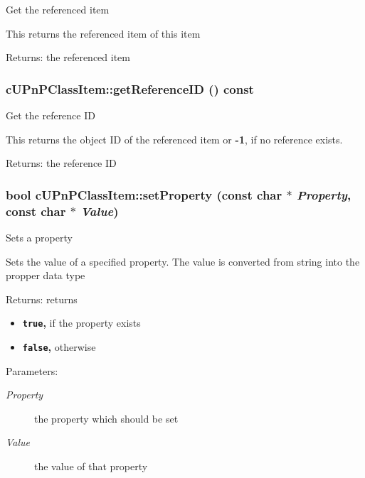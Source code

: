 Get the referenced item

This returns the referenced item of this item

\begin{Desc}
\item[Returns:]the referenced item \end{Desc}
\hypertarget{classcUPnPClassItem_c269fe6cfe8846722b90810a21e42bfc}{
\subsubsection[{getReferenceID}]{ cUPnPClassItem::getReferenceID () const}}
\label{classcUPnPClassItem_c269fe6cfe8846722b90810a21e42bfc}


Get the reference ID

This returns the object ID of the referenced item or {\bf -1}, if no reference exists.

\begin{Desc}
\item[Returns:]the reference ID \end{Desc}
\hypertarget{classcUPnPClassItem_ab17057659c17792a5b67f4297ade642}{
\subsubsection[{setProperty}]{\setlength{\rightskip}{0pt plus 5cm}bool cUPnPClassItem::setProperty (const char $\ast$ {\em Property}, \/  const char $\ast$ {\em Value})}}
\label{classcUPnPClassItem_ab17057659c17792a5b67f4297ade642}


Sets a property

Sets the value of a specified property. The value is converted from string into the propper data type

\begin{Desc}
\item[Returns:]returns\begin{itemize}
\item {\bf {\tt true},} if the property exists\item {\bf {\tt false},} otherwise \end{itemize}
\end{Desc}
\begin{Desc}
\item[Parameters:]
\begin{description}
\item[{\em Property}]the property which should be set \item[{\em Value}]the value of that property \end{description}
\end{Desc}


